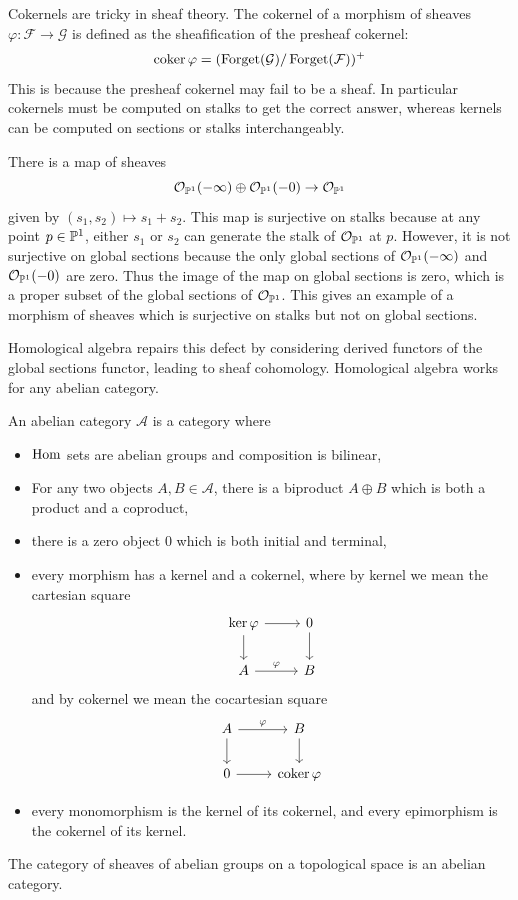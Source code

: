 \documentclass[12pt]{article}
\begin{document}
\begin{remark}
    Cokernels are tricky in sheaf theory. The cokernel of a morphism of sheaves $\varphi: \mathcal{F} \to \mathcal{G}$ is defined as the sheafification of the presheaf cokernel:
    \[\coker \varphi = (\Forget(\mathcal{G}) / \Forget(\mathcal{F}))^+\]
    This is because the presheaf cokernel may fail to be a sheaf. In particular cokernels must be computed on stalks to get the correct answer, whereas kernels can be computed on sections or stalks interchangeably.
\end{remark}

\begin{example}
There is a map of sheaves \[\cO_{\P^1}(-\infty) \oplus \cO_{\P^1}(-0) \to \cO_{\P^1}\] given by $(s_1, s_2) \mapsto s_1 + s_2$. This map is surjective on stalks because at any point $p \in \P^1$, either $s_1$ or $s_2$ can generate the stalk of $\cO_{\P^1}$ at $p$. However, it is not surjective on global sections because the only global sections of $\cO_{\P^1}(-\infty)$ and $\cO_{\P^1}(-0)$ are zero. Thus the image of the map on global sections is zero, which is a proper subset of the global sections of $\cO_{\P^1}$. This gives an example of a morphism of sheaves which is surjective on stalks but not on global sections.
\end{example}

Homological algebra repairs this defect by considering derived functors of the global sections functor, leading to sheaf cohomology. Homological algebra works for any abelian category.

\begin{definition}
    An abelian category $\mathcal{A}$ is a category where
    \begin{itemize}
        \item $\Hom$ sets are abelian groups and composition is bilinear,
        \item For any two objects $A,B \in \mathcal{A}$, there is a biproduct $A \oplus B$ which is both a product and a coproduct,
        \item there is a zero object $0$ which is both initial and terminal,
        \item every morphism has a kernel and a cokernel, where by kernel we mean the cartesian square
        \[\begin{tikzcd}
        \ker \varphi \arrow[r] \arrow[d] & 0 \arrow[d] \\
        A \arrow[r, "\varphi"] & B
        \end{tikzcd}\]
        and by cokernel we mean the cocartesian square
        \[\begin{tikzcd}
        A \arrow[r, "\varphi"] \arrow[d] & B \arrow[d] \\
        0 \arrow[r] & \coker \varphi
        \end{tikzcd}\]
        \item every monomorphism is the kernel of its cokernel, and every epimorphism is the cokernel of its kernel.
    \end{itemize}
\end{definition}
The category of sheaves of abelian groups on a topological space is an abelian category.
\end{document}

